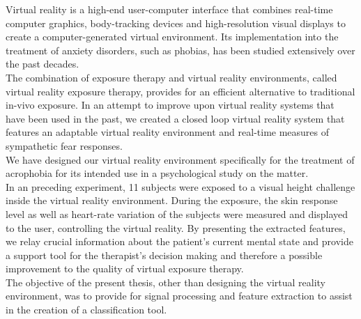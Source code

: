 
Virtual reality is a high-end user-computer interface that combines real-time computer graphics, body-tracking devices and high-resolution visual displays to create a computer-generated virtual environment. Its implementation into the treatment of anxiety disorders, such as phobias, has been studied extensively over the past decades. \\
The combination of exposure therapy and virtual reality environments, called virtual reality exposure therapy, provides for an efficient alternative to traditional in-vivo exposure. In an attempt to improve upon virtual reality systems that have been used in the past, we created a closed loop virtual reality system that features an adaptable virtual reality environment and real-time measures of sympathetic fear responses.\\
We have designed our virtual reality environment specifically for the treatment of acrophobia for its intended use in a psychological study on the matter.\\
In an preceding experiment, 11 subjects were exposed to a visual height challenge inside the virtual reality environment. During the exposure, the skin response level as well as heart-rate variation of the subjects were measured and displayed to the user, controlling the virtual reality. By presenting the extracted features, we relay crucial information about the patient's current mental state and provide a support tool for the therapist's decision making and therefore a possible improvement to the quality of virtual exposure therapy. \\
The objective of the present thesis, other than designing the virtual reality environment, was to provide for signal processing and feature extraction to assist in the creation of a classification tool.   




